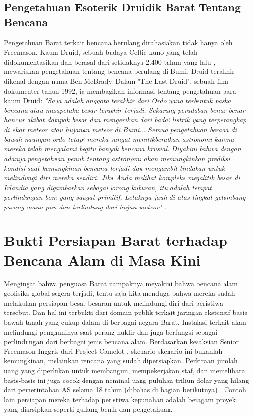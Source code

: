 \documentclass[10pt,twocolumn,letterpaper]{article}
\begin{document}
\subsection{Pengetahuan Esoterik Druidik Barat Tentang Bencana}

Pengetahuan Barat terkait bencana berulang dirahasiakan tidak hanya oleh Freemason. Kaum Druid, sebuah budaya Celtic kuno yang telah didokumentasikan dan berasal dari setidaknya 2.400 tahun yang lalu \cite{7}, mewariskan pengetahuan tentang bencana berulang di Bumi. Druid terakhir dikenal dengan nama Ben McBrady. Dalam "The Last Druid", sebuah film dokumenter tahun 1992, ia membagikan informasi tentang pengetahuan para kaum Druid: \textit{"Saya adalah anggota terakhir dari Ordo yang terbentuk paska bencana atau malapetaka besar terakhir terjadi. Sekarang peradaban benar-benar hancur akibat dampak besar dan mengerikan dari badai listrik yang terperangkap di ekor meteor atau hujanan meteor di Bumi... Semua pengetahuan berada di bawah naungan ordo tetapi mereka sangat menitikberatkan astronomi karena mereka telah mengalami begitu banyak bencana krusial. Diyakini bahwa dengan adanya pengetahuan penuh tentang astronomi akan memungkinkan prediksi kondisi saat kemungkinan bencana terjadi dan mengambil tindakan untuk melindungi diri mereka sendiri. Jika Anda melihat kompleks megalitik besar di Irlandia yang digambarkan sebagai lorong kuburan, itu adalah tempat perlindungan bom yang sangat primitif. Letaknya jauh di atas tingkat gelombang pasang mana pun dan terlindung dari hujan meteor"} \cite{8,9}.

\section{Bukti Persiapan Barat terhadap Bencana Alam di Masa Kini}

Mengingat bahwa penguasa Barat nampaknya meyakini bahwa bencana alam geofisika global segera terjadi, tentu saja kita menduga bahwa mereka sudah melakukan persiapan besar-besaran untuk melindungi diri dari peristiwa tersebut. Dan hal ini terbukti dari domain publik terkait jaringan ekstensif basis bawah tanah yang cukup dalam di berbagai negara Barat. Instalasi terkait akan melindungi penghuninya saat perang nuklir dan juga berfungsi sebagai perlindungan dari berbagai jenis bencana alam. Berdasarkan kesaksian Senior Freemason Inggris dari Project Camelot \cite{4,6}, skenario-skenario ini bukanlah kemungkinan, melainkan rencana yang sudah dipersiapkan. Perkiraan jumlah uang yang diperlukan untuk membangun, mempekerjakan staf, dan memelihara basis-basis ini juga cocok dengan nominal uang puluhan triliun dolar yang hilang dari pemerintahan AS selama 18 tahun (dibahas di bagian berikutnya) \cite{11,12,13}. Contoh lain persiapan mereka terhadap peristiwa kepunahan adalah beragam proyek yang diarsipkan seperti gudang benih dan pengetahuan.
\end{document}
